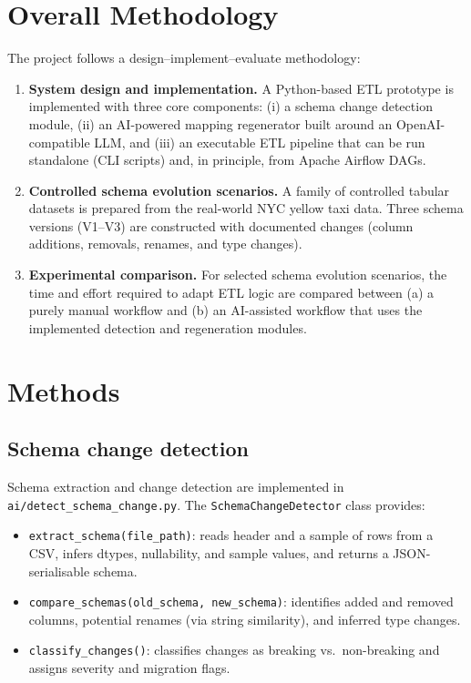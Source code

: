 \section{Overall Methodology}

The project follows a design--implement--evaluate methodology:
%
\begin{enumerate}
  \item \textbf{System design and implementation.} A Python-based ETL prototype
  is implemented with three core components: (i) a schema change detection
  module, (ii) an AI-powered mapping regenerator built around an
  OpenAI-compatible LLM, and (iii) an executable ETL pipeline that can be run
  standalone (CLI scripts) and, in principle, from Apache Airflow DAGs.
  \item \textbf{Controlled schema evolution scenarios.} A family of controlled
  tabular datasets is prepared from the real-world NYC yellow taxi data. Three
  schema versions (V1--V3) are constructed with documented changes (column
  additions, removals, renames, and type changes).
  \item \textbf{Experimental comparison.} For selected schema evolution
  scenarios, the time and effort required to adapt ETL logic are compared
  between (a) a purely manual workflow and (b) an AI-assisted workflow that
  uses the implemented detection and regeneration modules.
\end{enumerate}

\section{Methods}

\subsection{Schema change detection}

Schema extraction and change detection are implemented in
\texttt{ai/detect\_schema\_change.py}. The \texttt{SchemaChangeDetector} class
provides:
%
\begin{itemize}
  \item \texttt{extract\_schema(file\_path)}: reads header and a sample of rows
  from a CSV, infers dtypes, nullability, and sample values, and returns a
  JSON-serialisable schema.
  \item \texttt{compare\_schemas(old\_schema, new\_schema)}: identifies added
  and removed columns, potential renames (via string similarity), and inferred
  type changes.
  \item \texttt{classify\_changes()}: classifies changes as breaking vs.\
  non-breaking and assigns severity and migration flags.
\end{itemize}

